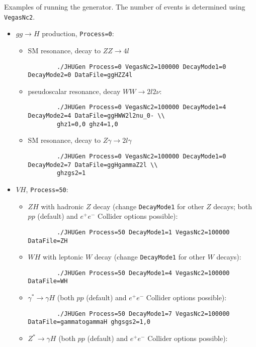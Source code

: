 \documentclass[aps,superscriptaddress,nofootinbib]{revtex4}
\begin{document}
Examples of running the generator.  The number of events is determined using \texttt{VegasNc2}.
\begin{itemize}
	\item $gg\to H$ production, \texttt{Process=0}:
	\begin{itemize}
		\item SM resonance, decay to $ZZ\to 4l$
		\begin{verbatim}
		./JHUGen Process=0 VegasNc2=100000 DecayMode1=0 DecayMode2=0 DataFile=ggHZZ4l
		\end{verbatim}
		\item pseudoscalar resonance, decay $WW\to 2l2\nu$:
		\begin{verbatim}
		./JHUGen Process=0 VegasNc2=100000 DecayMode1=4 DecayMode2=4 DataFile=ggHWW2l2nu_0- \\
		ghz1=0,0 ghz4=1,0
		\end{verbatim}
		\item SM resonance, decay to $Z\gamma\to 2l\gamma$
		\begin{verbatim}
		./JHUGen Process=0 VegasNc2=100000 DecayMode1=0 DecayMode2=7 DataFile=ggHgammaZ2l \\
		ghzgs2=1
		\end{verbatim}
	\end{itemize}
	\item $VH$, \texttt{Process=50}:
	\begin{itemize}
		\item $ZH$ with hadronic $Z$ decay (change \verb|DecayMode1| for other $Z$ decays; both $pp$ (default) and $e^+e^-$ Collider options possible):
		\begin{verbatim}
		./JHUGen Process=50 DecayMode1=1 VegasNc2=100000 DataFile=ZH
		\end{verbatim}
		\item $WH$ with leptonic $W$ decay (change \verb|DecayMode1| for other $W$ decays):
		\begin{verbatim}
		./JHUGen Process=50 DecayMode1=4 VegasNc2=100000 DataFile=WH
		\end{verbatim}
		\item $\gamma^*\to\gamma H$ (both $pp$ (default) and $e^+e^-$ Collider options possible):
		\begin{verbatim}
		./JHUGen Process=50 DecayMode1=7 VegasNc2=100000 DataFile=gammatogammaH ghgsgs2=1,0
		\end{verbatim}
		\item $Z^*\to\gamma H$ (both $pp$ (default) and $e^+e^-$ Collider options possible):
		\begin{verbatim}

\end{verbatim}
\end{itemize}
\end{itemize}
\end{document}

